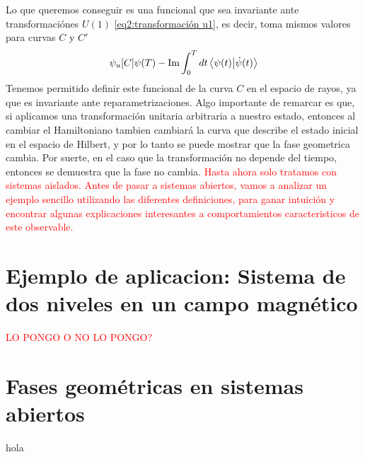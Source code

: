 Lo que queremos conseguir es una funcional que sea invariante ante transformaciónes $U(1)$ \ref{eq2:transformación u1}, es decir, toma mismos valores para curvas $C$ y $C'$
\begin{equation} \label{eq2:fg cinematica unitaria}
    \psi_u[C] \def \arg \braket{\psi(0)}{\psi(T)} - \Im \int_0^T dt \braket{\psi(t)}{\dot \psi(t)}
\end{equation}
Tenemos permitido definir este funcional de la curva $C$ en el espacio de rayos, ya que es invariante ante reparametrizaciones. Algo importante de remarcar es que, si aplicamos una transformación unitaria arbitraria a nuestro estado, entonces al cambiar el Hamiltoniano tambien cambiará la curva que describe el estado inicial en el espacio de Hilbert, y por lo tanto se puede mostrar que la fase geometrica cambia. Por suerte, en el caso que la transformación no depende del tiempo, entonces se demuestra que la fase no cambia. 
\newline
\textcolor{red}{Hasta ahora solo tratamos con sistemas aislados. Antes de pasar a sistemas abiertos, vamos a analizar un ejemplo sencillo utilizando las diferentes definiciones, para ganar intuición y encontrar algunas explicaciones interesantes a comportamientos caracteristicos de este observable.}

\section{Ejemplo de aplicacion: Sistema de dos niveles en un campo magn\'etico}

\textcolor{red}{LO PONGO O NO LO PONGO?}

\section{Fases geométricas en sistemas abiertos}
hola


